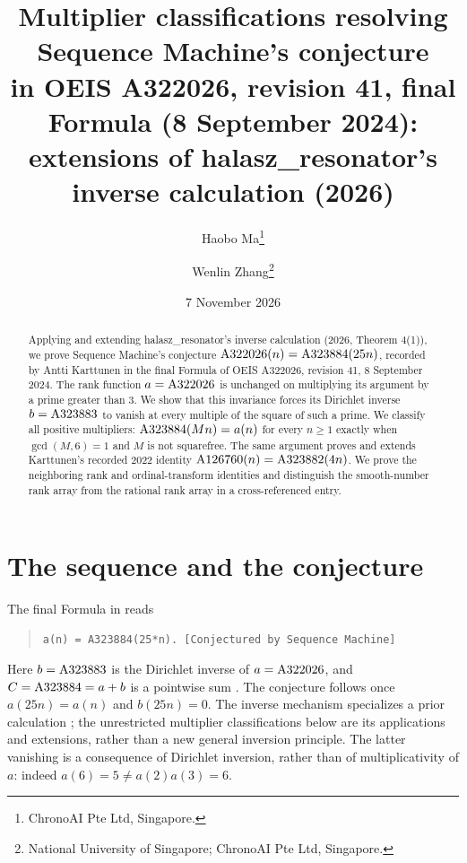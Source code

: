 \documentclass[11pt]{article}
\title{Multiplier classifications resolving Sequence Machine's conjecture\\
in OEIS A322026, revision 41, final Formula (8 September 2024):\\
extensions of halasz\_resonator's inverse calculation (2026)}
\author{Haobo Ma\thanks{ChronoAI Pte Ltd, Singapore.}\and
Wenlin Zhang\thanks{National University of Singapore; ChronoAI Pte Ltd, Singapore.}}
\date{7 November 2026}
\newcommand{\A}[1]{\textnormal{A#1}}
\begin{document}
\maketitle
\begin{abstract}
Applying and extending halasz\_resonator's inverse calculation (2026,
Theorem 4(1)), we prove Sequence Machine's conjecture
$\A{322026}(n)=\A{323884}(25n)$,
recorded by Antti Karttunen in the final Formula of OEIS A322026,
revision 41, 8 September 2024. The rank function $a=\A{322026}$ is unchanged
on multiplying its argument by a prime greater than $3$. We show that this
invariance forces its Dirichlet inverse $b=\A{323883}$ to vanish at every
multiple of the square of such a prime. We classify all positive multipliers:
$\A{323884}(Mn)=a(n)$ for every $n\geq1$ exactly when
$\gcd(M,6)=1$ and $M$ is not squarefree. The same argument proves and
extends Karttunen's recorded 2022 identity
$\A{126760}(n)=\A{323882}(4n)$.
We prove the neighboring rank and ordinal-transform identities and
distinguish the smooth-number rank array from the rational rank array
in a cross-referenced entry.
\end{abstract}

\section{The sequence and the conjecture}
The final Formula in \cite{a322026} reads
\begin{quote}
\texttt{a(n) = A323884(25*n). [Conjectured by Sequence Machine]}
\end{quote}
Here $b=\A{323883}$ is the Dirichlet inverse of $a=\A{322026}$, and
$C=\A{323884}=a+b$ is a pointwise sum \cite{inverse,sum}.
The conjecture follows once $a(25n)=a(n)$ and $b(25n)=0$.
The inverse mechanism specializes a prior calculation \cite{tower};
the unrestricted multiplier classifications below are its applications
and extensions, rather than a new general inversion principle.
The latter vanishing is a consequence of Dirichlet inversion, rather than
of multiplicativity of $a$: indeed $a(6)=5\ne a(2)a(3)=6$.
\end{document}
